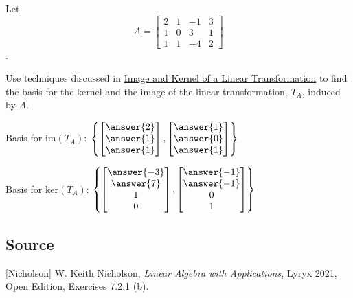 \documentclass{ximera}
\author{}
\begin{document}
\begin{exercise}
Let $$A=\begin{bmatrix}2 & 1 & -1 & 3\\1 & 0 & 3 & 1\\1 & 1 & -4 & 2\end{bmatrix}$$.  

Use techniques discussed in \href{https://ximera.osu.edu/linearalgebrav3/LinearAlgebraInteractiveIntro/LTR-0050/main}{Image and Kernel of a Linear Transformation} to find the basis for the kernel and the image of the linear transformation, $T_A$, induced by $A$.

Basis for $\mbox{im}(T_A)$: $\left\{\begin{bmatrix}\answer{2}\\\answer{1}\\\answer{1}\end{bmatrix}, \begin{bmatrix}\answer{1}\\\answer{0}\\\answer{1}\end{bmatrix}\right\}$

Basis for $\mbox{ker}(T_A)$: $\left\{\begin{bmatrix}\answer{-3}\\\answer{7}\\1\\0\end{bmatrix}, \begin{bmatrix}\answer{-1}\\\answer{-1}\\0\\1\end{bmatrix}\right\}$

 \end{exercise}

 \subsection*{Source}
[Nicholson] W. Keith Nicholson, {\it Linear Algebra with Applications}, Lyryx 2021, Open Edition, Exercises 7.2.1 (b). 
 
\end{document}
